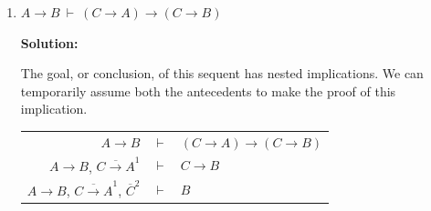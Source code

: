 \documentclass[11pt]{report}
\newcommand{\temp}[2]{{\overline{#2}}^{#1}}
\begin{document}
\begin{enumerate}
\begin{enumerate}
		\begin{center}
			$\begin{array}{c}
				\infer[\lor I_{L}]{C \lor D}
					{\infer[\MP]{C}
						{\temp{1}{A} & A \to C}}
			\end{array}$
		\end{center}

		\textbf{Case 2:}
		
		$$A \to C, \ B \to D, \temp{2}{B} \vdash C \lor D$$

		In this case $B$ yields a $D$ via $B \to D$, on which we can use $\lor$-introduction to give us $C \lor D$. 

		\begin{center}
			$\begin{array}{c}
				\infer[\lor I_{R}]{C \lor D}
					{\infer[\MP]{D}
						{\temp{2}{B} & B \to D}}
			\end{array}$
		\end{center}

		Together the separate cases, with $\lor$ elimination, complete the proof: 

		\begin{center}
			$\begin{array}{c}
				\infer[\lor E]{C \lor D}
					{A \lor B					
						&
					\infer[\to I,1]{A \to (C \lor D)}
						{\infer[\lor I_{L}]{C \lor D}
							{\infer[\MP]{C}
								{\temp{1}{A} & A \to C}}}
						&
					\infer[\to I, 2]{B \to (C \lor D)}
						{\infer[\lor I_{R}]{C \lor D}
							{\infer[\MP]{D}
								{\temp{2}{B} & B \to D}}}
					}				
			\end{array}$
		\end{center}
		

		\vspace{5mm}		
		\newpage
		\item $A \to B \ \vdash \ (C \to A) \to (C \to B)$	
		
		\vspace{5mm}
		\textbf{Solution:}

		The goal, or conclusion, of this sequent has nested implications. We can temporarily assume both the antecedents to make the proof of this implication. 

		\begin{center}
			\begin{tabular}{r c l}
				$A \to B$ & $\vdash$ & $(C \to A) \to (C \to B)$ \\
				$A \to B$, $\temp{1}{C \to A}$ & $\vdash$ & $C \to B$ \\
				$A \to B$, $\temp{1}{C \to A}$, $\temp{2}{C}$ & $\vdash$ & $B$ \\
			\end{tabular}
		\end{center}


\end{enumerate}
\end{enumerate}
\end{document}
